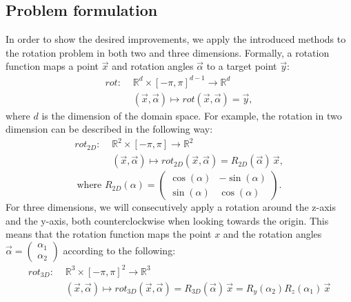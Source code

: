 \subsection{Problem formulation}
In order to show the desired improvements, we apply the introduced methods to the rotation problem in both two and three dimensions. Formally, a rotation function maps a point $\vec{x}$ and rotation angles $\vec{\alpha}$ to a target point $\vec{y}$:
\begin{equation}
\label{rot_fn}
\begin{aligned}
rot: \,\,&\mathbb{R}^{d} \times [- \pi, \pi] ^{d-1} \to \mathbb{R}^{d}\\
&(\vec{x}, \vec{\alpha}) \mapsto rot(\vec{x}, \vec{\alpha}) = \vec{y},
\end{aligned}
\end{equation}
where $d$ is the dimension of the domain space. For example, the rotation in two dimension can be described in the following way:
\begin{equation}
\label{rot_fn_dim2}
\begin{aligned}
rot_{2D}: \,\,& \mathbb{R}^{2} \times [- \pi, \pi]  \to \mathbb{R}^{2}\\
&(\vec{x}, \vec{\alpha}) \mapsto rot_{2D}(\vec{x}, \vec{\alpha}) = R_{2D}(\vec{\alpha}) \,\vec{x},
\end{aligned}
\end{equation}
\[\text{where} \,\,R_{2D}(\alpha) = \begin{pmatrix} \cos(\alpha) & -\sin(\alpha) \\\sin(\alpha) & \cos(\alpha) \end{pmatrix}.\]
\indent For three dimensions, we will consecutively apply a rotation around the z-axis and the y-axis, both counterclockwise when looking towards the origin. This means that the rotation function maps the point $x$ and the rotation angles $\vec{\alpha} = \begin{pmatrix}
\alpha_1\\
\alpha_2
\end{pmatrix}$ according to the following:
\begin{equation}
\label{rot_fn_dim3}
\begin{aligned}
rot_{3D}: \,\,& \mathbb{R}^{3} \times [- \pi, \pi]^2  \to \mathbb{R}^{3}\\
&(\vec{x}, \vec{\alpha}) \mapsto rot_{3D}(\vec{x}, \vec{\alpha}) = R_{3D}(\vec{\alpha})\,\vec{x} = R_{y}(\alpha_2) R_{z}(\alpha_1) \,\vec{x}
\end{aligned}
\end{equation}
